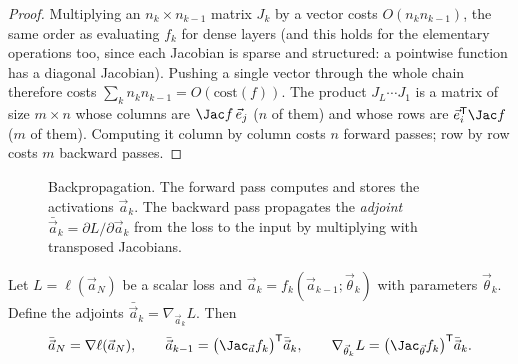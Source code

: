 \begin{proof}
Multiplying an $n_k\times n_{k-1}$ matrix $J_k$ by a vector costs $O(n_kn_{k-1})$, the same order as evaluating $f_k$ for dense layers (and this holds for the elementary operations too, since each Jacobian is sparse and structured: a pointwise function has a diagonal Jacobian). Pushing a single vector through the whole chain therefore costs $\sum_kn_kn_{k-1}=O(\text{cost}(f))$. The product $J_L\cdots J_1$ is a matrix of size $m\times n$ whose columns are $\Jac f\,\vec e_j$ ($n$ of them) and whose rows are $\vec e_i^{\mathsf T}\Jac f$ ($m$ of them). Computing it column by column costs $n$ forward passes; row by row costs $m$ backward passes.
\end{proof}

\begin{figure}[ht]
\centering
{}
\caption{Backpropagation. The forward pass computes and stores the activations $\vec a_k$. The backward pass propagates the \emph{adjoint} $\bar{\vec a}_k=\partial L/\partial\vec a_k$ from the loss to the input by multiplying with transposed Jacobians.}
\label{fig:backprop}
\end{figure}

\begin{theorem}[Backpropagation]\label{thm:backprop}
Let $L=\ell(\vec a_N)$ be a scalar loss and $\vec a_k=f_k(\vec a_{k-1};\vec\theta_k)$ with parameters $\vec\theta_k$. Define the adjoints $\bar{\vec a}_k=\nabla_{\vec a_k}L$. Then
\[
\bar{\vec a}_N=\nabla\ell(\vec a_N),\qquad\bar{\vec a}_{k-1}=\bigl(\Jac_{\vec a}f_k\bigr)^{\mathsf T}\bar{\vec a}_k,\qquad\nabla_{\vec\theta_k}L=\bigl(\Jac_{\vec\theta}f_k\bigr)^{\mathsf T}\bar{\vec a}_k .
\]
\end{theorem}

